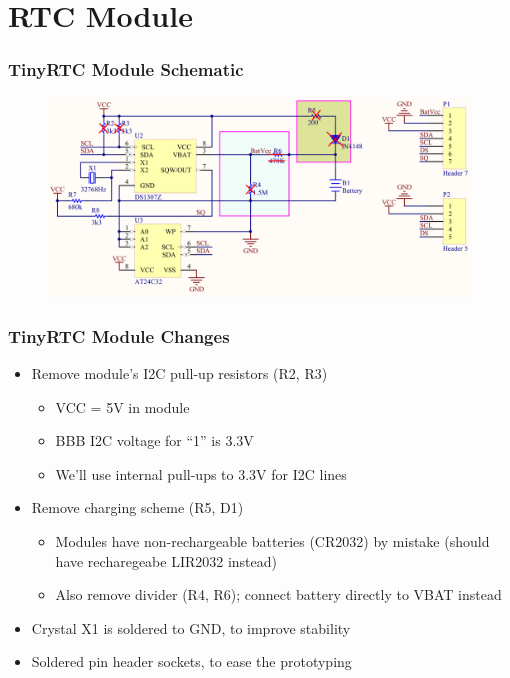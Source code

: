 \documentclass[aspectratio=169,usenames,dvipsnames]{beamer}
\begin{document}

\section{RTC Module}

\begin{frame}
  \frametitle{TinyRTC Module Schematic}
  \begin{figure}
    \centering
    \includegraphics[scale=0.15]{images/tinyrtc-scheme-mod.png}
  \end{figure}
  \vspace*{-12mm}
\end{frame}

\begin{frame}
  \frametitle{TinyRTC Module Changes}
  \begin{itemize}
    \item Remove module's I2C pull-up resistors (R2, R3)
    \begin{itemize}
      \item VCC = 5V in module
      \item BBB I2C voltage for ``1'' is 3.3V
      \item \alert{We'll use internal pull-ups to 3.3V for I2C lines}
    \end{itemize}
    \item Remove charging scheme (R5, D1)
    \begin{itemize}
      \item Modules have non-rechargeable batteries (CR2032) by mistake
            (should have recharegeabe LIR2032 instead)
      \item Also remove divider (R4, R6); connect battery directly to VBAT
            instead
    \end{itemize}
    \item Crystal X1 is soldered to GND, to improve stability
    \item Soldered pin header sockets, to ease the prototyping
  \end{itemize}
\end{frame}
\end{document}
